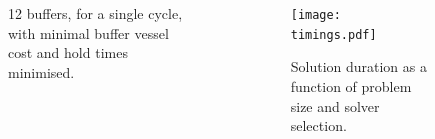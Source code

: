 \documentclass[final]{beamer}
\begin{document}
\begin{frame}[t]
\begin{columns}[t]
\begin{figure}
{                    12 buffers, for a single cycle, with minimal buffer vessel
                    cost and hold times minimised.}
                \end{figure}
                \begin{figure}
                    \texttt{[image: timings.pdf]}
                    \caption{\Large Solution duration as a function of problem
                        size and solver selection.}
                \end{figure}
        \end{columns}
    \end{frame}
\end{document}
